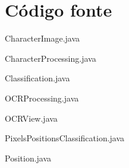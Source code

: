 \section{Código fonte}
\lstset{language=Java}
{\tiny 
	{\Large CharacterImage.java}
	

	{\Large CharacterProcessing.java}
	

	{\Large Classification.java}
	
	
	{\Large OCRProcessing.java}
	

	{\Large OCRView.java}
	
	
	{\Large PixelsPositionsClassification.java}
	

	{\Large Position.java}
	
}


